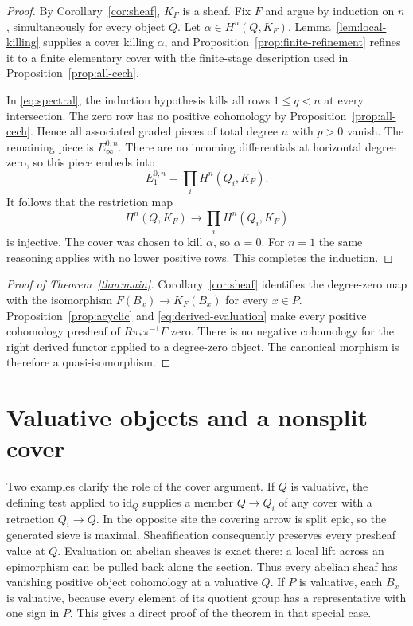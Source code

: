 \documentclass[11pt]{article}
\theoremstyle{definition}
\theoremstyle{remark}
\begin{document}
\begin{proof}
By Corollary~\ref{cor:sheaf}, $K_F$ is a sheaf. Fix $F$ and argue by induction on $n$, simultaneously for every object $Q$. Let $\alpha\in H^n(Q,K_F)$. Lemma~\ref{lem:local-killing} supplies a cover killing $\alpha$, and Proposition~\ref{prop:finite-refinement} refines it to a finite elementary cover with the finite-stage description used in Proposition~\ref{prop:all-cech}.

In \eqref{eq:spectral}, the induction hypothesis kills all rows $1\leq q<n$ at every intersection. The zero row has no positive cohomology by Proposition~\ref{prop:all-cech}. Hence all associated graded pieces of total degree $n$ with $p>0$ vanish. The remaining piece is $E_\infty^{0,n}$. There are no incoming differentials at horizontal degree zero, so this piece embeds into
\[
 E_1^{0,n}=\prod_i H^n(Q_i,K_F).
\]
It follows that the restriction map
\[
 H^n(Q,K_F)\longrightarrow\prod_iH^n(Q_i,K_F)
\]
is injective. The cover was chosen to kill $\alpha$, so $\alpha=0$. For $n=1$ the same reasoning applies with no lower positive rows. This completes the induction.
\end{proof}

\begin{proof}[Proof of Theorem~\ref{thm:main}]
Corollary~\ref{cor:sheaf} identifies the degree-zero map with the isomorphism $F(B_x)\to K_F(B_x)$ for every $x\in P$. Proposition~\ref{prop:acyclic} and \eqref{eq:derived-evaluation} make every positive cohomology presheaf of $R\pi_*\pi^{-1}F$ zero. There is no negative cohomology for the right derived functor applied to a degree-zero object. The canonical morphism is therefore a quasi-isomorphism.
\end{proof}

\section{Valuative objects and a nonsplit cover}

Two examples clarify the role of the cover argument. If $Q$ is valuative, the defining test applied to $\mathrm{id}_Q$ supplies a member $Q\to Q_i$ of any cover with a retraction $Q_i\to Q$. In the opposite site the covering arrow is split epic, so the generated sieve is maximal. Sheafification consequently preserves every presheaf value at $Q$. Evaluation on abelian sheaves is exact there: a local lift across an epimorphism can be pulled back along the section. Thus every abelian sheaf has vanishing positive object cohomology at a valuative $Q$. If $P$ is valuative, each $B_x$ is valuative, because every element of its quotient group has a representative with one sign in $P$. This gives a direct proof of the theorem in that special case.
\end{document}
